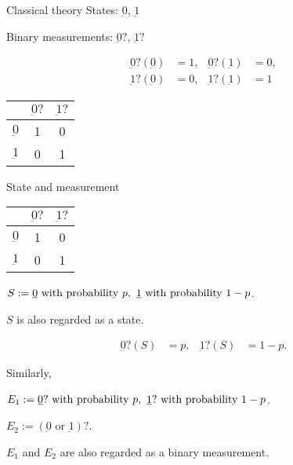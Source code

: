 \documentclass{beamer}
\newcommand\emm[1]{\textcolor{redorange}{{#1}}}
\begin{document}
\begin{frame}{Classical theory}
States: $\underbar{0}$, $\underbar{1}$

Binary measurements: $\underbar{0}?$, $\underbar{1}?$

\begin{align*}
\underbar{0}?(\underbar{0}) &= 1,&
\underbar{0}?(\underbar{1}) &= 0,\\
\underbar{1}?(\underbar{0}) &= 0,&
\underbar{1}?(\underbar{1}) &= 1
\end{align*}

\begin{center}
\begin{tabular}{|c||c|c|}
\hline
& $\underbar{0}?$& $\underbar{1}?$\\
\hline
\hline
$\underbar{0}$& 1&0\\
\hline
$\underbar{1}$& 0&1\\
\hline
\end{tabular}
\end{center}
\end{frame}


\begin{frame}{State and measurement}
\begin{center}
\begin{tabular}{|c||c|c|}
\hline
& $\underbar{0}?$& $\underbar{1}?$\\
\hline
\hline
$\underbar{0}$& 1&0\\
\hline
$\underbar{1}$& 0&1\\
\hline
\end{tabular}
\end{center}

$S := \text{$\underbar{0}$ with probability $p$,\, $\underbar{1}$ with probability $1-p$}$.

$S$ is also \emm{regarded as a state}.

\begin{align*}
\underbar{0}?(S) &= p,&
\underbar{1}?(S) &= 1-p.
\end{align*}

Similarly,

$E_1 := \text{$\underbar{0}?$ with probability $p$,\, $\underbar{1}?$ with probability $1-p$}$.

$E_2 := \text{$(\underbar{0}\text{ or }\underbar{1})?$}$.

$E_1$ and $E_2$ are also \emm{regarded as a binary measurement}.

\end{frame}
\end{document}
